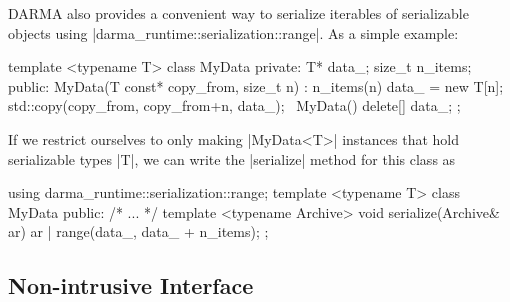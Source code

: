 DARMA also provides a convenient way to serialize iterables of serializable
objects using |darma_runtime::serialization::range|.  As a simple example:
\begin{CppCodeNumb}
template <typename T>
class MyData {
  private:
    T* data_;
    size_t n_items;
  public:
    MyData(T const* copy_from, size_t n)
      : n_items(n) {
      data_ = new T[n];
      std::copy(copy_from, copy_from+n, data_);
    }
    ~MyData() { delete[] data_; }
};
\end{CppCodeNumb}
If we restrict ourselves to only making |MyData<T>| instances that hold
serializable types |T|, we can write the |serialize| method for this class as
\begin{CppCodeNumb}
using darma_runtime::serialization::range;
template <typename T>
class MyData {
  public:
    /* ... */
    template <typename Archive>
    void serialize(Archive& ar) {
      ar | range(data_, data_ + n_items);
    }
};
\end{CppCodeNumb}

\subsection{Non-intrusive Interface}

